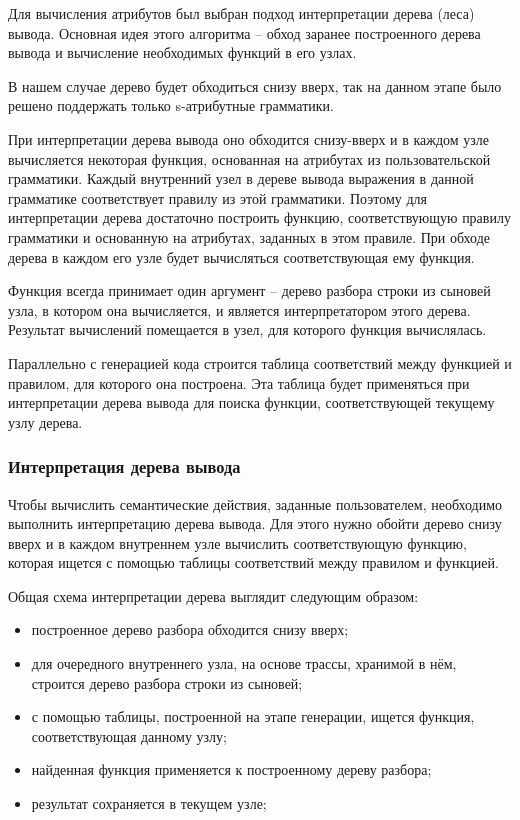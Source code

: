 Для вычисления атрибутов был выбран подход интерпретации дерева (леса) вывода. Основная идея этого алгоритма -- обход заранее построенного дерева вывода и вычисление необходимых функций в его узлах.

В нашем случае дерево будет обходиться снизу вверх, так на данном этапе было решено поддержать только s-атрибутные грамматики. 

При интерпретации дерева вывода оно обходится снизу-вверх и в каждом узле вычисляется некоторая функция, основанная на атрибутах из пользовательской грамматики. Каждый внутренний узел в дереве вывода выражения в данной грамматике соответствует правилу из этой грамматики. Поэтому для интерпретации дерева достаточно построить функцию, соответствующую правилу грамматики и основанную на атрибутах, заданных в этом правиле. При обходе дерева в каждом его узле будет вычисляться соответствующая ему функция.

Функция всегда принимает один аргумент -- дерево разбора строки из сыновей узла, в котором она вычисляется, и является интерпретатором этого дерева. Результат вычислений помещается в узел, для которого функция вычислялась.

Параллельно с генерацией кода строится таблица соответствий между функцией и правилом, для которого она построена. Эта таблица будет применяться при интерпретации дерева вывода для поиска функции, соответствующей текущему узлу дерева. 


\subsubsection{Интерпретация дерева вывода}

Чтобы вычислить семантические действия, заданные пользователем, необходимо выполнить интерпретацию дерева вывода. Для этого нужно обойти дерево снизу вверх и в каждом внутреннем узле вычислить соответствующую функцию, которая ищется с помощью таблицы соответствий между правилом и функцией.

Общая схема интерпретации дерева выглядит следующим образом:
\begin{itemize}
  \item построенное дерево разбора обходится снизу вверх;
  \item для очередного внутреннего узла, на основе трассы, хранимой в нём, строится дерево разбора строки из сыновей;
  \item с помощью таблицы, построенной на этапе генерации, ищется функция, соответствующая данному узлу;
  \item найденная функция применяется к построенному дереву разбора;
  \item результат сохраняется в текущем узле;
\end{itemize} 

